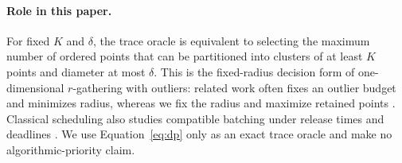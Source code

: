 \paragraph{Role in this paper.}
For fixed $K$ and $\delta$, the trace oracle is equivalent to selecting the
maximum number of ordered points that can be partitioned into clusters of at
least $K$ points and diameter at most $\delta$. This is the fixed-radius
decision form of one-dimensional $r$-gathering with outliers: related work
often fixes an outlier budget and minimizes radius, whereas we fix the radius
and maximize retained points \cite{aggarwal2010anonymity,akagi2015rgather,
nakano2019rgather}. Classical scheduling also studies compatible batching
under release times and deadlines \cite{barnoy2009throughput}. We use
Equation~\eqref{eq:dp} only as an exact trace oracle and make no algorithmic-priority
claim.

